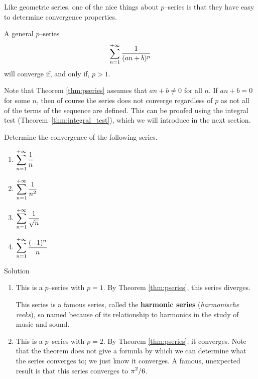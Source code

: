 Like geometric series, one of the nice things about $p$--series is that they have easy to determine convergence properties.



\begin{theorem}\label{thm:pseries}
A general $p$--series 
$$\displaystyle\sum_{n=1}^{+\infty} \frac{1}{(an+b)^p}$$
 will converge if, and only if, $p>1$.
\end{theorem}
Note that Theorem \ref{thm:pseries} assumes that $an+b\neq 0$ for all $n$. If $an+b=0$ for some $n$, then of course the series does not converge regardless of $p$ as not all of the terms of the sequence are defined. This can be proofed using the integral test (Theorem~\ref{thm:integral_test}), which we will introduce in the next section. 


\begin{example}\label{ex_series6}
Determine the convergence of the following series.\\
\begin{multicols}{4}
\begin{enumerate}
\item		$\displaystyle\sum_{n=1}^{+\infty} \frac{1}{n}$
\item		$\displaystyle\sum_{n=1}^{+\infty} \frac{1}{n^2}$
\item		$\displaystyle\sum_{n=1}^{+\infty} \frac{1}{\sqrt{n}}$
\item		$\displaystyle\sum_{n=1}^{+\infty} \frac{(-1)^n}{n}$
\end{enumerate}
\end{multicols}

Solution 


\begin{enumerate}
\item		This is a $p$--series with $p=1$. By Theorem \ref{thm:pseries}, this series diverges. 

This series is a famous series, called the \textbf{harmonic series} (\textit{harmonische reeks}), so named because of its relationship to harmonics in the study of music and sound.  

\item		This is a $p$--series with $p=2$. By Theorem \ref{thm:pseries}, it converges. Note that the theorem does not give a formula by which we can determine what the series converges to; we just know it converges. A famous, unexpected result is that this series converges to $\displaystyle{\pi^2}/{6}$.


\end{enumerate}
\end{example}
